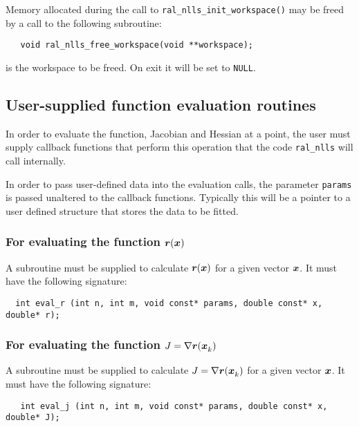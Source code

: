 \documentclass{spec}
\begin{document}
Memory allocated during the call to \texttt{ral\_nlls\_init\_workspace()} may be freed
by a call to the following subroutine:
\begin{verbatim}
   void ral_nlls_free_workspace(void **workspace);
\end{verbatim}

\begin{description}
    is the workspace to be freed. On exit it will be set to \texttt{NULL}.
\end{description}


\subsection{User-supplied function evaluation routines}
\label{sec::function_eval}
In order to evaluate the function, Jacobian and Hessian at a point, the user
must supply callback functions that perform this operation that the code
{\tt ral\_nlls} will call internally.

In order to pass user-defined data into the evaluation calls, the parameter
\texttt{params} is passed unaltered to the callback functions. Typically this
will be a pointer to a user defined structure that stores the data to be fitted.

\subsubsection{For evaluating the function ${\bm r}({\bm x})$}

A subroutine must be supplied to calculate ${\bm r}({\bm x})$ for a given vector ${\bm x}$.
It must have the following signature:
\begin{verbatim}
  int eval_r (int n, int m, void const* params, double const* x, double* r);
\end{verbatim}



\subsubsection{For evaluating the function $J = \nabla {\bm r}({\bm x}_{k}^{})$}
A subroutine must be supplied to calculate $J = \nabla {\bm r}({\bm x}_{k}^{})$ for a given vector ${\bm x}$. It must have the following signature:

\begin{verbatim}
   int eval_j (int n, int m, void const* params, double const* x, double* J);
\end{verbatim}
\end{document}
